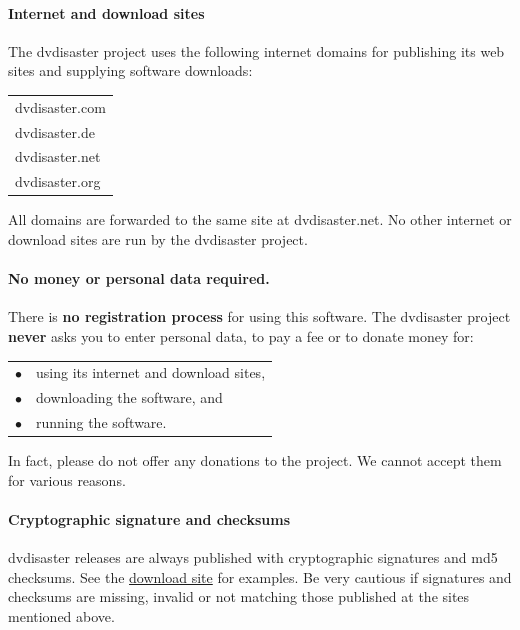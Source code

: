 \paragraph{Internet and download sites}\quad

\smallskip

The dvdisaster project uses the following internet domains for publishing
its web sites and supplying software downloads:

\begin{center}
  \begin{tabular}{l}
dvdisaster.com\\
dvdisaster.de\\
dvdisaster.net\\
dvdisaster.org
  \end{tabular}
\end{center}

All domains are forwarded to the same site at dvdisaster.net.
No other internet or download sites are run by the dvdisaster project.

\paragraph{No money or personal data required.}\quad

\smallskip

There is {\bf no registration process} for using this software.
The dvdisaster project {\bf never} asks you to enter personal data,
to pay a fee or to donate money for:

\smallskip

\begin{tabular}{ll}
$\bullet$ & using its internet and download sites,\\
$\bullet$ & downloading the software, and\\
$\bullet$ & running the software. \\
\end{tabular}

\smallskip

In fact, please do not offer any donations to the project. 
We cannot accept them for various reasons.

\paragraph{Cryptographic signature and checksums}\quad
\smallskip

dvdisaster releases are always published with cryptographic signatures
and md5 checksums. See the \href{http://dvdisaster.net}{download site} for examples.
Be very cautious if signatures and checksums are missing, invalid or not
matching those published at the sites mentioned above.
